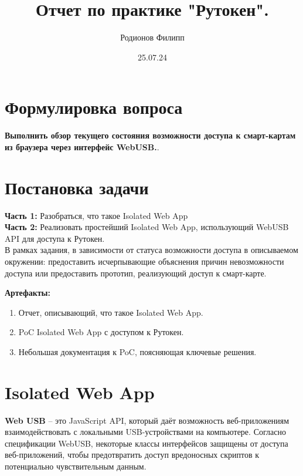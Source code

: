 \documentclass[12pt]{article}
\title{Отчет по практике "Рутокен".}
\author{Родионов Филипп}
\date{25.07.24}
\begin{document}
\markboth{\theauthor}{\thetitle}

\maketitle

\section{Формулировка вопроса}
\textbf{Выполнить обзор текущего состояния возможности доступа к смарт-картам из браузера через интерфейс WebUSB.}.
\section{Постановка задачи}
\textbf{Часть 1:} Разобраться, что такое Isolated Web App \\
\textbf{Часть 2:} Реализовать простейший Isolated Web App, использующий WebUSB API для доступа к Рутокен. \\

В рамках задания, в зависимости от статуса возможности доступа в описываемом окружении: предоставить исчерпывающие объяснения причин невозможности доступа или предоставить прототип, реализующий доступ к смарт-карте.

\begin{tcolorbox}
\textbf{Артефакты: }
\begin{enumerate}
    \item Отчет, описывающий, что такое Isolated Web App.
    \item PoC Isolated Web App с доступом к Рутокен. 
    \item Небольшая документация к PoC, поясняющая ключевые решения.
\end{enumerate}
\end{tcolorbox}

\section{Isolated Web App}
\textbf{Web USB} -- это JavaScript API, который даёт возможность веб-приложениям взаимодействовать с локальными USB-устройствами на компьютере. Согласно спецификации WebUSB, некоторые классы интерфейсов защищены от доступа веб-приложений, чтобы предотвратить доступ вредоносных скриптов к потенциально чувствительным данным. \\
\end{document}
